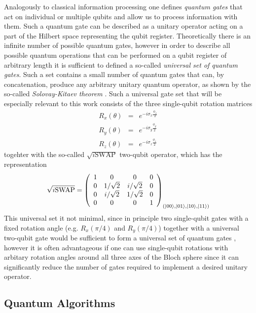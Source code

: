 Analogously to classical information processing one defines {\it quantum gates} that act on individual or multiple qubits and allow us to process information with them. Such a quantum gate can be described as a unitary operator acting on a part of the Hilbert space representing the qubit register. Theoretically there is an infinite number of possible quantum gates, however in order to describe all possible quantum operations that can be performed on a qubit register of arbitrary length it is sufficient to defined a so-called {\it universal set of quantum gates}. Such a set contains a small number of quantum gates that can, by concatenation, produce any arbitrary unitary quantum operator, as shown by the so-called {\it Solovay-Kitaev theorem} \citep{nielsen_quantum_2000,dawson_solovay-kitaev_2005}. Such a universal gate set that will be especially relevant to this work consists of the three single-qubit rotation matrices
%
\begin{eqnarray}
   R_x(\theta)  & = & e^{-i\sigma_x\frac{\phi_x}{2}} \\ 
   R_y(\theta)  & = & e^{-i\sigma_y\frac{\phi_y}{2}} \\ 
   R_z(\theta)  & = & e^{-i\sigma_z\frac{\phi_z}{2}} 
\label{eq:universal_single_qubit_gates}
\end{eqnarray}
%
togehter with the so-called $\sqrt{i\mathrm{SWAP}}$ two-qubit operator, which has the representation
%
\begin{equation}
\sqrt{i\mathrm{SWAP}} = \left( \begin{array}{cccc} 1 & 0 & 0 & 0 \\ 0 & 1/\sqrt{2} & i/\sqrt{2} & 0 \\ 0 & i/\sqrt{2} & 1/\sqrt{2} & 0 \\ 0 & 0 & 0 & 1  \end{array}  \right)_{(\left| 00 \right>,\left| 01 \right>,\left| 10 \right>,\left| 11 \right>)}
\end{equation}
%
This universal set it not minimal, since in principle two single-qubit gates with a fixed rotation angle (e.g. $R_x(\pi/4)$ and $R_y(\pi/4)$) together with a universal two-qubit gate would be sufficient to form a universal set of quantum gates \citep{dawson_solovay-kitaev_2005}, however it is often advantageous if one can use single-qubit rotations with arbitary rotation angles around all three axes of the Bloch sphere since it can significantly reduce the number of gates required to implement a desired unitary operator.

\subsection{Quantum Algorithms}

